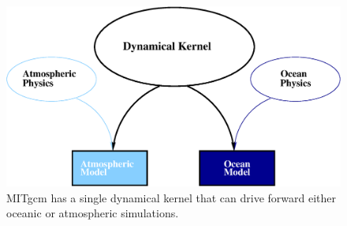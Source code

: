 \begin{figure}
\begin{center}
 \includegraphics*[width=.9\textwidth]{s_overview/figs/onemodel.eps}
\end{center}
\caption{MITgcm has a single dynamical kernel that can drive forward
either oceanic or atmospheric simulations.}
\label{fig:onemodel}
\end{figure}
